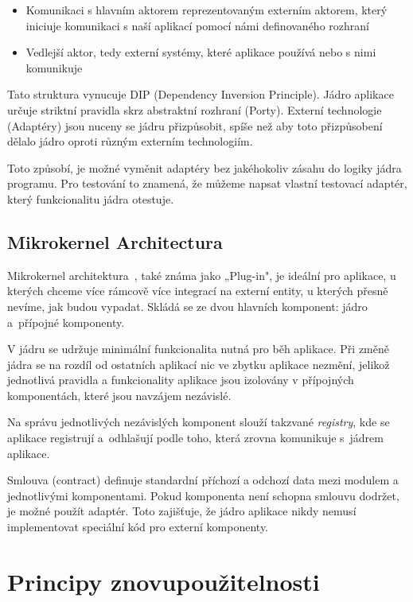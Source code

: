 \begin{itemize}
    \item Komunikaci s hlavním aktorem reprezentovaným externím aktorem, který iniciuje komunikaci s naší aplikací pomocí námi definovaného rozhraní
    \item Vedlejší aktor, tedy externí systémy, které aplikace používá nebo s nimi komunikuje
\end{itemize}

Tato struktura vynucuje DIP (Dependency Inversion Principle). Jádro aplikace určuje striktní pravidla skrz abstraktní rozhraní (Porty). Externí technologie (Adaptéry) jsou nuceny se jádru přizpůsobit, spíše než aby toto přizpůsobení dělalo jádro oproti různým externím technologiím.

Toto způsobí, je možné vyměnit adaptéry bez jakéhokoliv zásahu do logiky jádra programu. Pro testování to znamená, že můžeme napsat vlastní testovací adaptér, který funkcionalitu jádra otestuje.

\subsection{Mikrokernel Architectura}

Mikrokernel architektura~\cite{Microkernel}, také známa jako „Plug-in", je ideální pro aplikace, u kterých chceme více rámcově více integrací na externí entity, u kterých přesně nevíme, jak budou vypadat. Skládá se ze dvou hlavních komponent: jádro a~přípojné komponenty. 

V jádru se udržuje minimální funkcionalita nutná pro běh aplikace. Při změně jádra se na rozdíl od ostatních aplikací nic ve zbytku aplikace nezmění, jelikož jednotlivá pravidla a funkcionality aplikace jsou izolovány v přípojných komponentách, které jsou navzájem nezávislé.

Na správu jednotlivých nezávislých komponent slouží takzvané \textit{registry}, kde se aplikace registrují a~odhlašují podle toho, která zrovna komunikuje s~jádrem aplikace.

Smlouva (contract) definuje standardní příchozí a odchozí data mezi modulem a jednotlivými komponentami. Pokud komponenta není schopna smlouvu dodržet, je možné použít adaptér. Toto zajišťuje, že jádro aplikace nikdy nemusí implementovat speciální kód pro externí komponenty.

\section{Principy znovupoužitelnosti}

